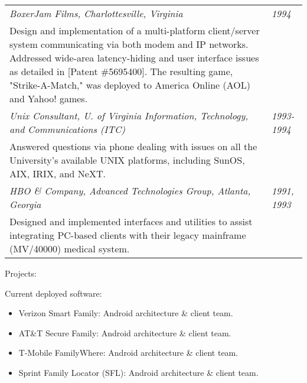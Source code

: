 \begin{tabular}{p{5.2in}@{\hspace{1.5cm}}l}

    \em BoxerJam Films, Charlottesville, Virginia                & \em 1994 \\[3pt]
       Design and implementation of a multi-platform
       client/server system communicating via both modem and IP
       networks.  Addressed wide-area latency-hiding and user interface
       issues as detailed in [Patent \#5695400].  The resulting game, "Strike-A-Match,"
       was deployed to America Online (AOL) and Yahoo! games.
       \\[9pt]



    \em Unix Consultant, U. of Virginia Information, 
         Technology, and Communications  (ITC)              & \em 1993-1994 \\[3pt]
       Answered questions via phone dealing with issues on all the
       University's available UNIX platforms, including SunOS,
       AIX, IRIX, and NeXT. \\[9pt]

    \em HBO \& Company, Advanced Technologies Group, 
           Atlanta, Georgia                                      & \em 1991, 1993 \\[3pt]
       Designed and implemented interfaces and utilities to
       assist integrating PC-based clients with their
       legacy mainframe (MV/40000) medical system. \\[9pt]

\end{tabular}


\medskip
\bigskip


\begin{bf} \large
Projects:
\end{bf}
\medskip
\medskip

Current deployed software:
	   	   
	   \begin{itemize}
		\item Verizon Smart Family: Android architecture \& client team. \\[-16pt]
		\item AT\&T Secure Family: Android architecture \& client team. \\[-16pt]
		\item T-Mobile FamilyWhere: Android architecture \& client team. \\[-16pt]
		\item Sprint Family Locator (SFL): Android architecture \& client team.  \\[-16pt]
	\end{itemize}

